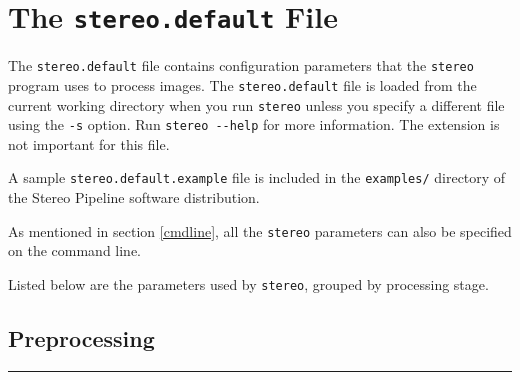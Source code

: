 \chapter{The {\tt stereo.default} File}
\label{ch:stereodefault}

The \texttt{stereo.default} file contains configuration parameters
that the \texttt{stereo} program uses to process images.  The
\texttt{stereo.default} file is loaded from the current working
directory when you run \texttt{stereo} unless you specify a different
file using the \texttt{-s} option. Run \texttt{stereo -\/-help} for
more information. The extension is not important for this file.

A sample \texttt{stereo.default.example} file is included in the
\texttt{examples/} directory of the Stereo Pipeline software
distribution.

As mentioned in section \ref{cmdline}, all the \texttt{stereo}
parameters can also be specified on the command line.

Listed below are the parameters used by \texttt{stereo}, grouped by
processing stage.



\section{Preprocessing}
\label{stereo-default-preprocessing}
\hrule
\bigskip

